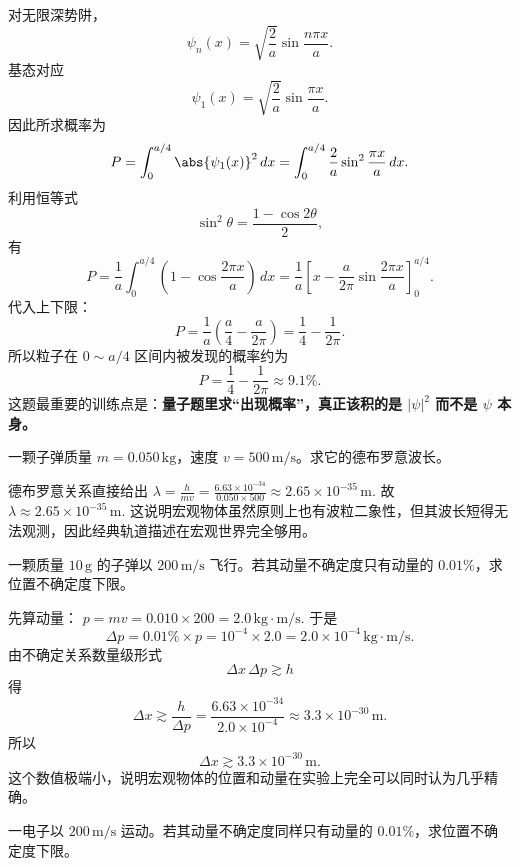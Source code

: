 \documentclass[lang=cn,11pt]{elegantbook}
\begin{document}
\begin{solution}
对无限深势阱，
\[
\psi_n(x)=\sqrt{\frac{2}{a}}\sin\frac{n\pi x}{a}.
\]
基态对应
\[
\psi_1(x)=\sqrt{\frac{2}{a}}\sin\frac{\pi x}{a}.
\]
因此所求概率为
\[
P=\int_0^{a/4}\abs{\psi_1(x)}^2\,dx
=\int_0^{a/4}\frac{2}{a}\sin^2\frac{\pi x}{a}\,dx.
\]
利用恒等式
\[
\sin^2\theta=\frac{1-\cos2\theta}{2},
\]
有
\[
P=\frac{1}{a}\int_0^{a/4}\left(1-\cos\frac{2\pi x}{a}\right)\,dx
=\frac{1}{a}\left[x-\frac{a}{2\pi}\sin\frac{2\pi x}{a}\right]_0^{a/4}.
\]
代入上下限：
\[
P=\frac{1}{a}\left(\frac{a}{4}-\frac{a}{2\pi}\right)
=\frac14-\frac{1}{2\pi}.
\]
所以粒子在 \(0\sim a/4\) 区间内被发现的概率约为
\[
\boxed{P=\frac14-\frac{1}{2\pi}\approx 9.1\%.}
\]
这题最重要的训练点是：\textbf{量子题里求“出现概率”，真正该积的是 \(|\psi|^2\) 而不是 \(\psi\) 本身。}
\end{solution}

\begin{exercise}[子弹的德布罗意波长有多短]
一颗子弹质量 \(m=0.050\,\mathrm{kg}\)，速度 \(v=500\,\mathrm{m/s}\)。求它的德布罗意波长。
\end{exercise}

\begin{solution}
德布罗意关系直接给出
 \(\lambda=\frac{h}{mv} =\frac{6.63\times 10^{-34}}{0.050\times 500} \approx 2.65\times 10^{-35}\,\mathrm{m}.\) 
故
 \(\boxed{\lambda\approx 2.65\times 10^{-35}\,\mathrm{m}.}\) 
这说明宏观物体虽然原则上也有波粒二象性，但其波长短得无法观测，因此经典轨道描述在宏观世界完全够用。
\end{solution}

\begin{exercise}[子弹动量很精确时位置仍会有多大不确定]
一颗质量 \(10\,\mathrm{g}\) 的子弹以 \(200\,\mathrm{m/s}\) 飞行。若其动量不确定度只有动量的 \(0.01\%\)，求位置不确定度下限。
\end{exercise}

\begin{solution}
先算动量：
 \(p=mv=0.010\times 200=2.0\,\mathrm{kg\cdot m/s}.\) 
于是
\[
\Delta p=0.01\%\times p=10^{-4}\times 2.0=2.0\times 10^{-4}\,\mathrm{kg\cdot m/s}.
\]
由不确定关系数量级形式
\[
\Delta x\,\Delta p\gtrsim h
\]
得
\[
\Delta x\gtrsim \frac{h}{\Delta p}
=\frac{6.63\times 10^{-34}}{2.0\times 10^{-4}}
\approx 3.3\times 10^{-30}\,\mathrm{m}.
\]
所以
\[
\boxed{\Delta x\gtrsim 3.3\times 10^{-30}\,\mathrm{m}.}
\]
这个数值极端小，说明宏观物体的位置和动量在实验上完全可以同时认为几乎精确。
\end{solution}

\begin{exercise}[电子在同样相对精度下的位置不确定度]
一电子以 \(200\,\mathrm{m/s}\) 运动。若其动量不确定度同样只有动量的 \(0.01\%\)，求位置不确定度下限。
\end{exercise}
\end{document}
